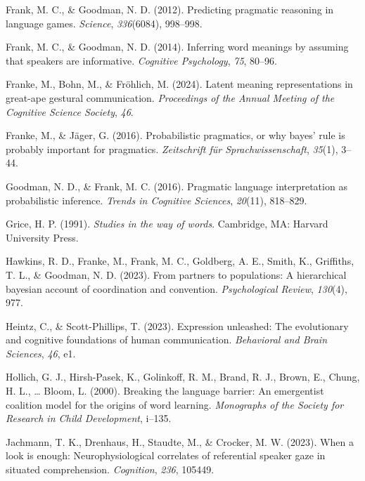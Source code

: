 \documentclass[
  man,floatsintext]{apa6}
\newlength{\cslhangindent}
\newenvironment{CSLReferences}[2] %
 {\begin{list}{}{%
  \setlength{\itemindent}{0pt}
  \setlength{\leftmargin}{0pt}
  \setlength{\parsep}{0pt}
  \ifodd #1
   \setlength{\leftmargin}{\cslhangindent}
   \setlength{\itemindent}{-1\cslhangindent}
  \fi
  \setlength{\itemsep}{#2\baselineskip}}}
 {\end{list}}
\begin{document}
\begin{CSLReferences}{1}{0}
Frank, M. C., \& Goodman, N. D. (2012). Predicting pragmatic reasoning in language games. \emph{Science}, \emph{336}(6084), 998--998.

Frank, M. C., \& Goodman, N. D. (2014). Inferring word meanings by assuming that speakers are informative. \emph{Cognitive Psychology}, \emph{75}, 80--96.

Franke, M., Bohn, M., \& Fröhlich, M. (2024). Latent meaning representations in great-ape gestural communication. \emph{Proceedings of the Annual Meeting of the Cognitive Science Society}, \emph{46}.

Franke, M., \& Jäger, G. (2016). Probabilistic pragmatics, or why bayes' rule is probably important for pragmatics. \emph{Zeitschrift f{ü}r Sprachwissenschaft}, \emph{35}(1), 3--44.

Goodman, N. D., \& Frank, M. C. (2016). Pragmatic language interpretation as probabilistic inference. \emph{Trends in Cognitive Sciences}, \emph{20}(11), 818--829.

Grice, H. P. (1991). \emph{Studies in the way of words}. Cambridge, MA: Harvard University Press.

Hawkins, R. D., Franke, M., Frank, M. C., Goldberg, A. E., Smith, K., Griffiths, T. L., \& Goodman, N. D. (2023). From partners to populations: A hierarchical bayesian account of coordination and convention. \emph{Psychological Review}, \emph{130}(4), 977.

Heintz, C., \& Scott-Phillips, T. (2023). Expression unleashed: The evolutionary and cognitive foundations of human communication. \emph{Behavioral and Brain Sciences}, \emph{46}, e1.

Hollich, G. J., Hirsh-Pasek, K., Golinkoff, R. M., Brand, R. J., Brown, E., Chung, H. L., \ldots{} Bloom, L. (2000). Breaking the language barrier: An emergentist coalition model for the origins of word learning. \emph{Monographs of the Society for Research in Child Development}, i--135.

Jachmann, T. K., Drenhaus, H., Staudte, M., \& Crocker, M. W. (2023). When a look is enough: Neurophysiological correlates of referential speaker gaze in situated comprehension. \emph{Cognition}, \emph{236}, 105449.


\end{CSLReferences}
\end{document}
